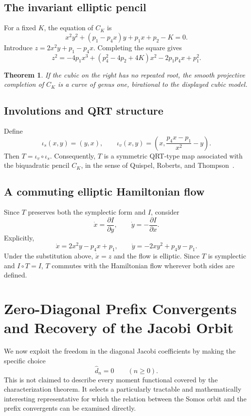 \documentclass[11pt]{article}
\newtheorem{theorem}{Theorem}
\theoremstyle{remark}
\begin{document}
\subsection{The invariant elliptic pencil}
For a fixed $K$, the equation of $C_K$ is
\begin{equation}
x^2y^2+(p_1-p_4x)y+p_1x+p_2-K=0.
\end{equation}
Introduce $z=2x^2y+p_1-p_4x$. Completing the square gives
\begin{equation}
z^2=-4p_1x^3+(p_4^2-4p_2+4K)x^2-2p_1p_4x+p_1^2.
\end{equation}
\begin{theorem}
If the cubic on the right has no repeated root, the smooth projective completion of $C_K$ is a curve of genus one, birational to the displayed cubic model.
\end{theorem}

\subsection{Involutions and QRT structure}
Define
\[
\iota_s(x,y)=(y,x),\qquad
\iota_v(x,y)=\left(x,\frac{p_4x-p_1}{x^2}-y\right).
\]
Then $T=\iota_v\circ\iota_s$. Consequently, $T$ is a symmetric QRT-type map associated with the biquadratic pencil $C_K$, in the sense of Quispel, Roberts, and Thompson~\cite{QRT1988}.

\subsection{A commuting elliptic Hamiltonian flow}
Since $T$ preserves both the symplectic form and $I$, consider
\begin{equation}
\dot x=\frac{\partial I}{\partial y},\qquad \dot y=-\frac{\partial I}{\partial x}.
\end{equation}
Explicitly,
\begin{equation}
\dot x=2x^2y-p_4x+p_1,\qquad \dot y=-2xy^2+p_4y-p_1.
\end{equation}
Under the substitution above, $\dot x=z$ and the flow is elliptic. Since $T$ is symplectic and $I\circ T=I$, $T$ commutes with the Hamiltonian flow wherever both sides are defined.


\section{Zero-Diagonal Prefix Convergents and Recovery of the Jacobi Orbit}

We now exploit the freedom in the diagonal Jacobi coefficients by making the
specific choice
\[
\widehat d_n=0\qquad(n\geq 0).
\]
This is not claimed to describe every moment functional covered by the
characterization theorem.  It selects a particularly tractable and
mathematically interesting representative for which the relation between the
Somos orbit and the prefix convergents can be examined directly.
\end{document}
